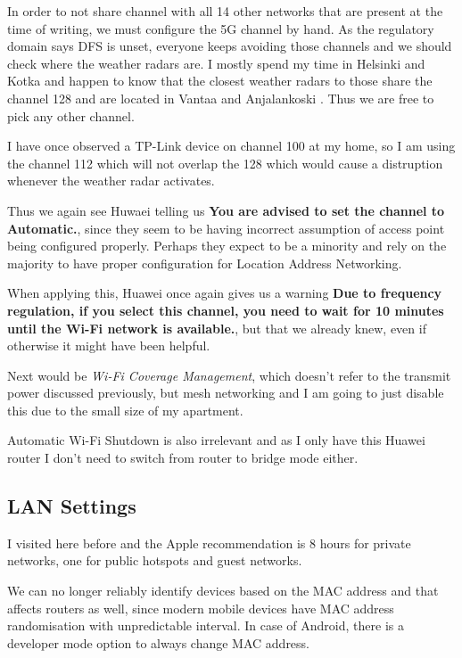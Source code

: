 \documentclass[../wifi-security.tex]{subfiles}
\begin{document}
In order to not share channel with all 14 other networks that are present at the time of writing, we must configure the 5G channel by hand. As the regulatory domain says DFS is unset, everyone keeps avoiding those channels and we should check where the weather radars are. I mostly spend my time in Helsinki and Kotka and happen to know that the closest weather radars to those share the channel 128 and are located in Vantaa and Anjalankoski \autocite{metisweather}. Thus we are free to pick any other channel.

I have once observed a TP-Link device on channel 100 at my home, so I am using the channel 112 which will not overlap the 128 which would cause a distruption whenever the weather radar activates.

Thus we again see Huwaei telling us \textbf{You are advised to set the channel to Automatic.}, since they seem to be having incorrect assumption of access point being configured properly. Perhaps they expect to be a minority and rely on the majority to have proper configuration for Location Address Networking.

When applying this, Huawei once again gives us a warning \textbf{Due to frequency regulation, if you select this channel, you need to wait for 10 minutes until the Wi-Fi network is available.}, but that we already knew, even if otherwise it might have been helpful.

Next would be \textit{Wi-Fi Coverage Management}, which doesn't refer to the transmit power discussed previously, but mesh networking and I am going to just disable this due to the small size of my apartment.

Automatic Wi-Fi Shutdown is also irrelevant and as I only have this Huawei router I don't need to switch from router to bridge mode either.

\subsection{LAN Settings}

I visited here before and the Apple recommendation is 8 hours for private networks, one for public hotspots and guest networks.\autocite{appleap}

We can no longer reliably identify devices based on the MAC address and that affects routers as well, since modern mobile devices have MAC address randomisation with unpredictable interval. In case of Android, there is a developer mode option to always change MAC address.
\end{document}
